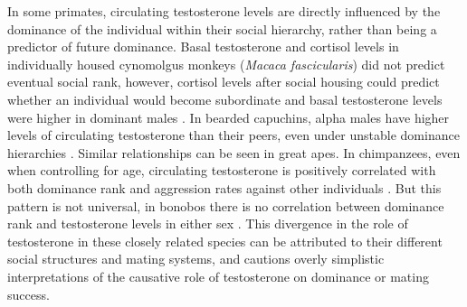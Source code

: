 In some primates, circulating testosterone levels are directly influenced by the dominance of the individual within their social hierarchy, rather than being a predictor of future dominance. Basal testosterone and cortisol levels in individually housed cynomolgus monkeys (\textit{Macaca fascicularis}) did not predict eventual social rank, however, cortisol levels after social housing could predict whether an individual would become subordinate and basal testosterone levels were higher in dominant males \citep{Czoty.2009}. In bearded capuchins, alpha males have higher levels of circulating testosterone than their peers, even under unstable dominance hierarchies \citep{Mendonça-Furtado.2014}. Similar relationships can be seen in great apes.  In chimpanzees, even when controlling for age, circulating testosterone is positively correlated with both dominance rank and aggression rates against other individuals \citep{Anestis.2006}. But this pattern is not universal, in bonobos there is no correlation between dominance rank and testosterone levels in either sex \citep{Sannen.2003}. This divergence in the role of testosterone in these closely related species can be attributed to their different social structures and mating systems, and cautions overly simplistic interpretations of the causative role of testosterone on dominance or mating success.

